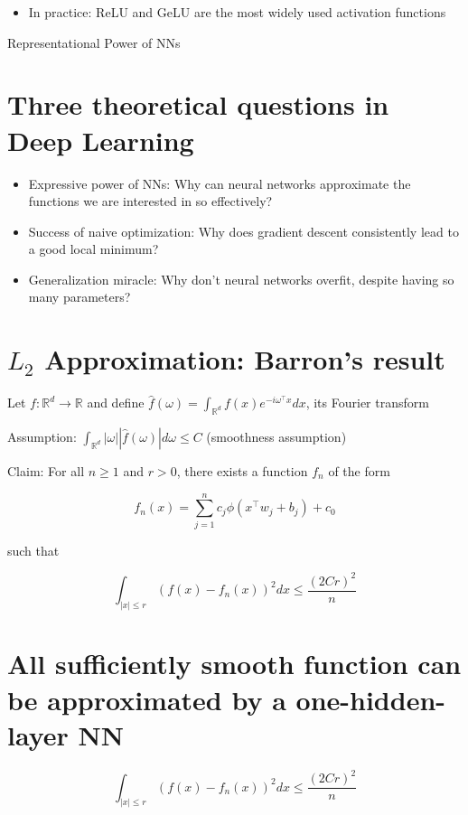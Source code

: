 \documentclass[10pt]{article}
\begin{document}
\begin{itemize}
  \item In practice: ReLU and GeLU are the most widely used activation functions
\end{itemize}

Representational Power of NNs

\section*{Three theoretical questions in Deep Learning}
\begin{itemize}
  \item Expressive power of NNs: Why can neural networks approximate the functions we are interested in so effectively?

  \item Success of naive optimization: Why does gradient descent consistently lead to a good local minimum?

  \item Generalization miracle: Why don't neural networks overfit, despite having so many parameters?

\end{itemize}

\section*{$L_{2}$ Approximation: Barron's result}
Let $f: \mathbb{R}^{d} \rightarrow \mathbb{R}$ and define $\hat{f}(\omega)=\int_{\mathbb{R}^{d}} f(x) e^{-i \omega^{\top} x} d x$, its Fourier transform

Assumption: $\int_{\mathbb{R}^{d}}|\omega||\hat{f}(\omega)| d \omega \leq C$ (smoothness assumption)

Claim: For all $n \geq 1$ and $r>0$, there exists a function $f_{n}$ of the form

$$
f_{n}(x)=\sum_{j=1}^{n} c_{j} \phi\left(x^{\top} w_{j}+b_{j}\right)+c_{0}
$$

such that

$$
\int_{|x| \leq r}\left(f(x)-f_{n}(x)\right)^{2} d x \leq \frac{(2 C r)^{2}}{n}
$$

\section*{All sufficiently smooth function can be approximated by a one-hidden-layer NN}
$$
\int_{|x| \leq r}\left(f(x)-f_{n}(x)\right)^{2} d x \leq \frac{(2 C r)^{2}}{n}
$$
\end{document}
